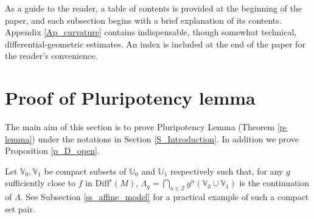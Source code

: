 \documentclass{amsart}
\theoremstyle{definition}
\numberwithin{equation}{section}
\numberwithin{figure}{section}
\begin{document}
As a guide to the reader, a table of contents is provided at the beginning of the paper, and each subsection begins with a brief explanation of its contents. 
Appendix \ref{Ap_curvature} contains indispensable, though somewhat technical, differential-geometric estimates. 
An index is included at the end of the paper for the reader's convenience.




\section{Proof of Pluripotency lemma}\label{S_Pf_Pl}

The main aim of this section is to prove Pluripotency Lemma (Theorem \ref{p-lemma})  under the notations in Section \ref{S_Introduction}.
In addition we prove Proposition \ref{p_D_open}.


Let ${\mathbb{V}}_{0},{\mathbb{V}}_{1}$ be compact  subsets of ${\mathbb{U}}_{0}$ and ${\mathbb{U}}_{1}$ respectively such that, for any 
$g$ sufficiently close to $f$ in $\mathrm{Diff}^r(M)$, 
$\Lambda_g=\bigcap_{n\in\mathbb{Z}}g^n({\mathbb{V}}_{0}\cup {\mathbb{V}}_{1})$ 
is the continuation of $\Lambda$.
See Subsection \ref{ss_affine_model} for a practical example of such a compact set pair.
\end{document}
